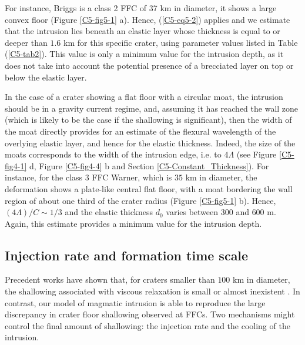 For instance, Briggs is a class 2 FFC of 37 km in diameter, it shows a
large    convex   floor    (Figure    \ref{C5-fig5-1}   a).     Hence,
(\ref{C5-eq5-2})  applies  and we  estimate  that  the intrusion  lies
beneath an  elastic layer whose thickness  is equal to or  deeper than
$1.6$ km  for this specific  crater, using parameter values  listed in
Table  (\ref{C5-tab2}). This  value is  only a  minimum value  for the
intrusion  depth, as  it  does  not take  into  account the  potential
presence of a brecciated layer on top or below the elastic layer.
		
In the case of a crater showing a flat floor with a circular moat, the
intrusion should be in a gravity  current regime, and, assuming it has
reached  the  wall  zone (which  is  likely  to  be  the case  if  the
shallowing  is  significant), then  the  width  of the  moat  directly
provides for an  estimate of the flexural wavelength  of the overlying
elastic layer, and hence for  the elastic thickness.  Indeed, the size
of the moats  corresponds to the width of the  intrusion edge, i.e. to
$4\Lambda$ (see Figure \ref{C5-fig4-1} d, Figure \ref{C5-fig4-4} b and
Section \ref{C5-Constant_Thickness}).   For instance, for the  class 3
FFC Warner,  which is  $35$ km  in diameter,  the deformation  shows a
plate-like central flat  floor, with a moat bordering  the wall region
of about  one third of  the crater radius (Figure  \ref{C5-fig5-1} b).
Hence, $(4\Lambda)/C\sim 1/3$ and the elastic thickness $d_0$ varies
between $300$ and  $600 $ m.  Again, this estimate  provides a minimum
value for the intrusion depth.
			
\subsection{Injection rate and formation time scale}
\label{C5-InjectionRateDiscussion}
		
Precedent works have shown that, for  craters smaller than $100$ km in
diameter, the  shallowing associated with viscous  relaxation is small
or almost  inexistent \citep{Dombard:2001gs}.  In contrast,  our model
of magmatic  intrusion is able  to reproduce the large  discrepancy in
crater floor shallowing observed at FFCs. Two mechanisms might control
the final amount of shallowing: the  injection rate and the cooling of
the intrusion.
		
